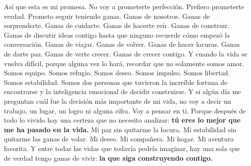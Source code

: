 \documentclass[10pt,twocolumn]{article}
\begin{document}
\begin{list}{}{\setlength{\leftmargin}{2.4cm}\setlength{\rightmargin}{2.4cm}\setlength{\topsep}{0pt}\setlength{\partopsep}{0pt}}
Así que esta es mi promesa. No voy a prometerte perfección. Prefiero prometerte verdad. Prometo seguir teniendo ganas. Ganas de nosotros. Ganas de sorprenderte. Ganas de cuidarte. Ganas de hacerte reír. Ganas de construir. Ganas de discutir ideas contigo hasta que ninguno recuerde cómo empezó la conversación. Ganas de viajar. Ganas de volver. Ganas de hacer locuras. Ganas de darte paz. Ganas de verte crecer. Ganas de crecer contigo. Y cuando la vida se vuelva difícil, porque alguna vez lo hará, recordar que no solamente somos amor. Somos equipo. Somos refugio. Somos deseo. Somos impulso. Somos libertad. Somos estabilidad. Somos dos personas que tuvieron la increíble fortuna de encontrarse y la inteligencia emocional de decidir construirse. Y si algún día me preguntan cuál fue la decisión más importante de mi vida, no voy a decir un trabajo, un lugar, un logro ni alguna cifra. Voy a pensar en ti. Porque después de todo lo vivido hay una certeza que no necesito analizar: \textbf{tú eres lo mejor que me ha pasado en la vida.} Mi paz sin quitarme la locura. Mi estabilidad sin quitarme las ganas de volar. Mi deseo. Mi compañera. Mi hogar. Mi aventura favorita. Y entre todas las vidas que todavía podría imaginar, hay una sola que de verdad tengo ganas de vivir: \textbf{la que siga construyendo contigo.}
\end{list}
\endgroup
\end{document}
